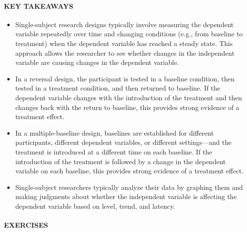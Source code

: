 \documentclass[
]{krantz}
\providecommand{\tightlist}{%
  \setlength{\itemsep}{0pt}\setlength{\parskip}{0pt}}
\begin{document}
\hypertarget{key-takeaways-27}{%
\paragraph*{KEY TAKEAWAYS}\label{key-takeaways-27}}

\begin{itemize}
\tightlist
\item
  Single-subject research designs typically involve measuring the dependent variable repeatedly over time and changing conditions (e.g., from baseline to treatment) when the dependent variable has reached a steady state. This approach allows the researcher to see whether changes in the independent variable are causing changes in the dependent variable.
\item
  In a reversal design, the participant is tested in a baseline condition, then tested in a treatment condition, and then returned to baseline. If the dependent variable changes with the introduction of the treatment and then changes back with the return to baseline, this provides strong evidence of a treatment effect.
\item
  In a multiple-baseline design, baselines are established for different participants, different dependent variables, or different settings---and the treatment is introduced at a different time on each baseline. If the introduction of the treatment is followed by a change in the dependent variable on each baseline, this provides strong evidence of a treatment effect.
\item
  Single-subject researchers typically analyze their data by graphing them and making judgments about whether the independent variable is affecting the dependent variable based on level, trend, and latency.
\end{itemize}

\hypertarget{exercises-23}{%
\paragraph*{EXERCISES}\label{exercises-23}}
\end{document}
